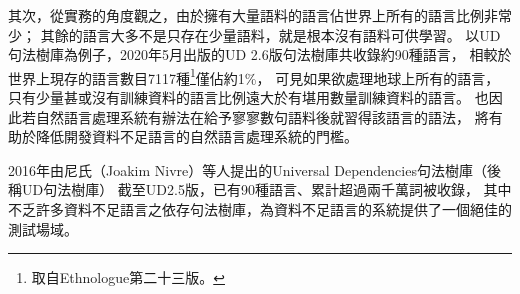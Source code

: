 其次，從實務的角度觀之，由於擁有大量語料的語言佔世界上所有的語言比例非常少；
其餘的語言大多不是只存在少量語料，就是根本沒有語料可供學習。
以UD句法樹庫為例子，2020年5月出版的UD 2.6版句法樹庫共收錄約90種語言，
相較於世界上現存的語言數目7117種\footnote{取自Ethnologue第二十三版\cite{eberhard2020ethnologue}。}僅佔約1\%，
可見如果欲處理地球上所有的語言，只有少量甚或沒有訓練資料的語言比例遠大於有堪用數量訓練資料的語言。
也因此若自然語言處理系統有辦法在給予寥寥數句語料後就習得該語言的語法，
將有助於降低開發資料不足語言的自然語言處理系統的門檻。

\iffalse
原因有兩點：
然而多語言訓練的目標，是提高訓練語言（training languages）在其測試集（testing set）上的準確率，
而提高訓練語言的準確率，未必就代表在資料不足語言上的準確率也會隨之提高；
有可能出現訓練語言與資料不足語言差異過大，而導致多語言訓練模型無法幫助資料不足語言的任務表現。
芬氏（Chelsea Finn）在2018年提出的模型無關元學習（model-agnostic meta-learning）
\cite{Finn2017ModelAgnosticMF}為所有使用梯度下降法（gradient descent）進行最佳化的模型的提供了一項簡潔且有效的方法處理資料不足任務。
在語言轉移學習的框架下，其目標是替未見過的語言（unseen languages）尋找一合適參數初始值，使得少量步數梯度更新後，參數在該語言的測試集上表現最佳。
其強調使用少量步數進行梯度更新，即是由於資料不足語言資料稀少，過多步數容易過擬合。
不若單純的多語言訓練，模型無關元學習於訓練階段的目標並非提高在訓練語言上的表現，
而是直接最佳化模型在未見過語言上調適（fine-tuning）後的表現，訓練與測試環境沒有不匹配之處，
有效防止模型只在訓練語言的測試集上有好表現，而無法推廣到資料不足語言上的問題。
\fi

2016年由尼氏（Joakim Nivre）等人提出的Universal Dependencies句法樹庫\cite{Nivre2016UniversalDV}（後稱UD句法樹庫）
截至UD2.5版，已有90種語言、累計超過兩千萬詞被收錄\cite{Nivre2020UniversalDV}，
其中不乏許多資料不足語言之依存句法樹庫，為資料不足語言的系統提供了一個絕佳的測試場域。

